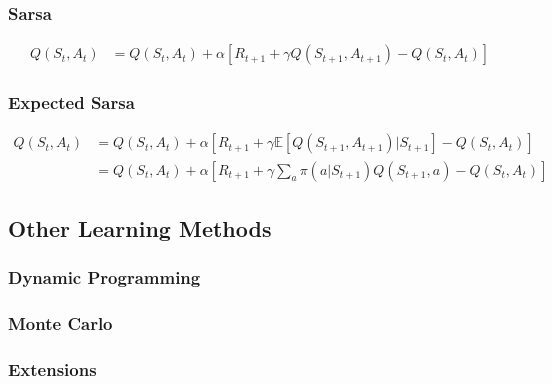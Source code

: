 \documentclass[result.tex]{subfiles}
\begin{document}
    \subsubsection*{Sarsa}

    \begin{align*}
        Q(S_t, A_t) &=
        Q(S_t , A_t) +
        \alpha \left[
        R_{t + 1} +
        \gamma Q(S_{t + 1}, A_{t + 1}) - Q(S_t, A_t)
        \right]
    \end{align*}

    \subsubsection*{Expected Sarsa}

    \begin{align*}
        Q(S_t, A_t) &=
        Q(S_t , A_t) +
        \alpha \left[
        R_{t + 1} +
        \gamma \mathbb{E} \left[ Q(S_{t + 1}, A_{t + 1}) | S_{t + 1}
        \right] -
        Q(S_t, A_t)
        \right] \\
        &=
        Q(S_t , A_t) +
        \alpha \left[
        R_{t + 1} +
        \gamma \sum_a \pi (a | S_{t + 1}) Q(S_{t + 1}, a) -
        Q(S_t, A_t)
        \right]
    \end{align*}

    \subsection*{Other Learning Methods}

    \subsubsection*{Dynamic Programming}

    \subsubsection*{Monte Carlo}

    \subsubsection*{Extensions}
\end{document}
